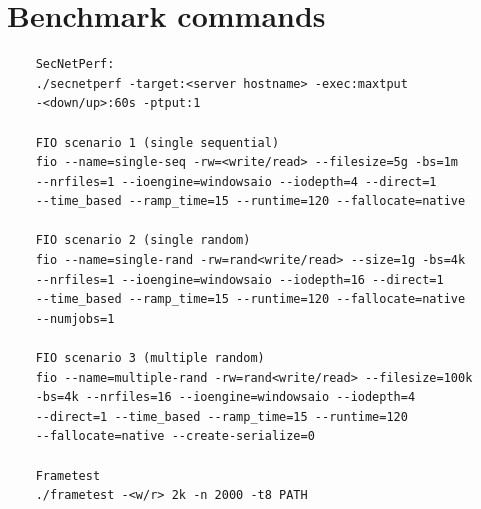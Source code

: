 \documentclass[english, 12pt, a4paper, elec, utf8, a-2b, online]{aaltothesis}
\begin{document}
\section{Benchmark commands}
\label{app:bench}
\begin{verbatim}
	SecNetPerf:
	./secnetperf -target:<server hostname> -exec:maxtput
	-<down/up>:60s -ptput:1

	FIO scenario 1 (single sequential)
	fio --name=single-seq -rw=<write/read> --filesize=5g -bs=1m
	--nrfiles=1 --ioengine=windowsaio --iodepth=4 --direct=1
	--time_based --ramp_time=15 --runtime=120 --fallocate=native

	FIO scenario 2 (single random)
	fio --name=single-rand -rw=rand<write/read> --size=1g -bs=4k
	--nrfiles=1 --ioengine=windowsaio --iodepth=16 --direct=1
	--time_based --ramp_time=15 --runtime=120 --fallocate=native
	--numjobs=1

	FIO scenario 3 (multiple random)
	fio --name=multiple-rand -rw=rand<write/read> --filesize=100k
	-bs=4k --nrfiles=16 --ioengine=windowsaio --iodepth=4
	--direct=1 --time_based --ramp_time=15 --runtime=120
	--fallocate=native --create-serialize=0

	Frametest
	./frametest -<w/r> 2k -n 2000 -t8 PATH
\end{verbatim}
\end{document}
